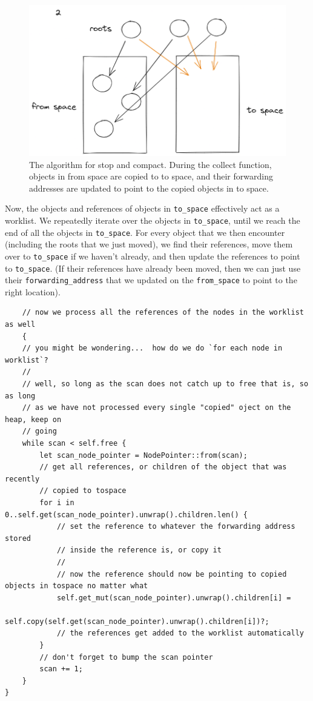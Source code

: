 \documentclass[index]{subfiles}
\begin{document}
\begin{figure}[H]
    \centering
    \includegraphics[scale=0.3]{pics/visualization-of-worklist.png}
    \caption{The algorithm for stop and compact. During the collect function, objects in from space are copied to to space, and their forwarding addresses are updated to point to the copied objects in to space.}
\end{figure}

Now, the objects and references of objects in \verb+to_space+ effectively act as a worklist. We repeatedly iterate over the objects in \verb+to_space+, until we reach the end of all the objects in \verb+to_space+. For every object that we then encounter (including the roots that we just moved), we find their references, move them over to \verb+to_space+ if we haven't already, and then update the references to point to \verb+to_space+. (If their references have already been moved, then we can just use their \verb+forwarding_address+ that we updated on the \verb+from_space+ to point to the right location).

\begin{verbatim}
    // now we process all the references of the nodes in the worklist as well
    {
    // you might be wondering...  how do we do `for each node in worklist`?
    // 
    // well, so long as the scan does not catch up to free that is, so as long
    // as we have not processed every single "copied" oject on the heap, keep on
    // going
    while scan < self.free {
        let scan_node_pointer = NodePointer::from(scan);
        // get all references, or children of the object that was recently
        // copied to tospace
        for i in 0..self.get(scan_node_pointer).unwrap().children.len() {
            // set the reference to whatever the forwarding address stored
            // inside the reference is, or copy it
            // 
            // now the reference should now be pointing to copied objects in tospace no matter what
            self.get_mut(scan_node_pointer).unwrap().children[i] =
                self.copy(self.get(scan_node_pointer).unwrap().children[i])?;
            // the references get added to the worklist automatically
        }
        // don't forget to bump the scan pointer
        scan += 1;
    }
}
\end{verbatim}
\end{document}
